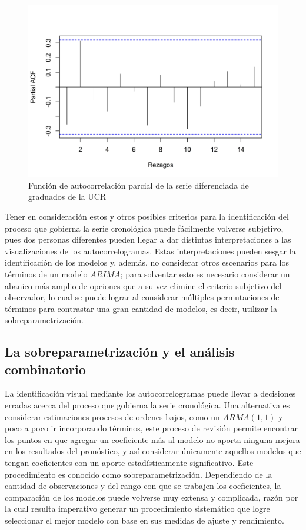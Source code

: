 \documentclass[
]{article}
\begin{document}
\begin{figure}[H]
\includegraphics[width=1\linewidth,height=1\textheight]{Tesis_files/figure-latex/parcial_ucr2-1} \caption{Función de autocorrelación parcial de la serie diferenciada de graduados de la UCR}\label{fig:parcial_ucr2}
\end{figure}

Tener en consideración estos y otros posibles criterios para la
identificación del proceso que gobierna la serie cronológica puede
fácilmente volverse subjetivo, pues dos personas diferentes pueden
llegar a dar distintas interpretaciones a las visualizaciones de los
autocorrelogramas. Estas interpretaciones pueden sesgar la
identificación de los modelos y, además, no considerar otros escenarios
para los términos de un modelo \(ARIMA\); para solventar esto es
necesario considerar un abanico más amplio de opciones que a su vez
elimine el criterio subjetivo del observador, lo cual se puede lograr al
considerar múltiples permutaciones de términos para contrastar una gran
cantidad de modelos, es decir, utilizar la sobreparametrización.

\subsection{La sobreparametrización y el análisis combinatorio}

La identificación visual mediante los autocorrelogramas puede llevar a
decisiones erradas acerca del proceso que gobierna la serie cronológica.
Una alternativa es considerar estimaciones procesos de ordenes bajos,
como un \(ARMA(1,1)\) y poco a poco ir incorporando términos, este
proceso de revisión permite encontrar los puntos en que agregar un
coeficiente más al modelo no aporta ninguna mejora en los resultados del
pronóstico, y así considerar únicamente aquellos modelos que tengan
coeficientes con un aporte estadísticamente significativo. Este
procedimiento es conocido como sobreparametrización. Dependiendo de la
cantidad de observaciones y del rango con que se trabajen los
coeficientes, la comparación de los modelos puede volverse muy extensa y
complicada, razón por la cual resulta imperativo generar un
procedimiento sistemático que logre seleccionar el mejor modelo con base
en sus medidas de ajuste y rendimiento.
\end{document}
